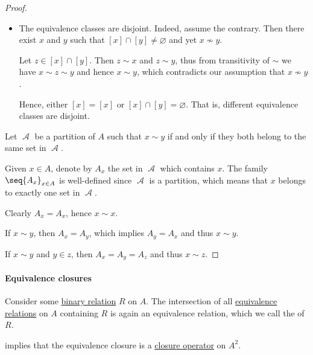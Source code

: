 \begin{comments}
\begin{proof}
\begin{itemize}
    \item The equivalence classes are disjoint. Indeed, assume the contrary. Then there exist \( x \) and \( y \) such that \( [x] \cap [y] \neq \varnothing \) and yet \( x \nsim y \).

    Let \( z \in [x] \cap [y] \). Then \( z \sim x \) and \( z \sim y \), thus from transitivity of \( {\sim} \) we have \( x \sim z \sim y \) and hence \( x \sim y \), which contradicts our assumption that \( x \nsim y \).

    Hence, either \( [x] = [x] \) or \( [x] \cap [y] = \varnothing \). That is, different equivalence classes are disjoint.
  \end{itemize}

   Let \( \mscrA \) be a partition of \( A \) such that \( x \sim y \) if and only if they both belong to the same set in \( \mscrA \).

  Given \( x \in A \), denote by \( A_x \) the set in \( \mscrA \) which contains \( x \). The family \( \seq{ A_x }_{x \in A} \) is well-defined since \( \mscrA \) is a partition, which means that \( x \) belongs to exactly one set in \( \mscrA \).

   Clearly \( A_x = A_x \), hence \( x \sim x \).

   If \( x \sim y \), then \( A_x = A_y \), which implies \( A_y = A_x \) and thus \( x \sim y \).

   If \( x \sim y \) and \( y \in z \), then \( A_x = A_y = A_z \) and thus \( x \sim z \).
\end{proof}

\paragraph{Equivalence closures}

\begin{definition}\label{def:equivalence_closure}
  Consider some \hyperref[def:binary_relation]{binary relation} \( R \) on \( A \). The intersection of all \hyperref[def:equivalence_relation]{equivalence relations} on \( A \) containing \( R \) is again an equivalence relation, which we call the  of \( R \).
\end{definition}
\begin{comments}
  \item {} implies that the equivalence closure is a \hyperref[def:abstract_closure_operator]{closure operator} on \( A^2 \).


\end{comments}
\end{comments}
